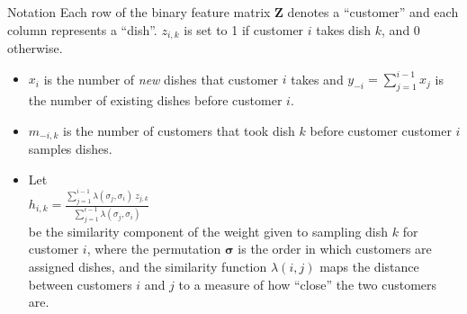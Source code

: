 \documentclass[serif,mathserif,final]{beamer}
\def\suml#1#2#3{\sum\limits_{#1=#2}^{#3}}
\def\ds{\displaystyle}
\def\hik{\ds\frac{\suml{j}{1}{i-1}\lambda(\sigma_j,\sigma_i)~z_{j,k}}
        {\suml{j}{1}{i-1}\lambda(\sigma_j,\sigma_i)}}
\begin{document}
\begin{frame}{}
\begin{columns}[t]
\begin{column}{0.25\linewidth}
      \begin{block}{Notation}
        Each row of the binary feature matrix $\bm Z$ denotes a ``customer''
        and each column represents a ``dish''. $z_{i,k}$ is set to 1 if
        customer $i$ takes dish $k$, and  0 otherwise. \\
        \vspace{1em}
        \begin{itemize}
          \setlength{\itemsep}{20pt}
          \item $x_i$ is the number of \textit{new} dishes that customer $i$ takes
            and $y_{-i} = \suml{j}{1}{i-1} x_j$ is the number of existing dishes
            before customer $i$.
          \item $m_{-i,k}$ is the number of customers that took dish $k$ before customer
            customer $i$ samples dishes.
          \item Let \\\hspace{.25\textwidth} $h_{i,k} = \hik$ \\
            be the similarity component of the weight
            given to sampling dish $k$ for customer $i$, where the permutation
            $\bm\sigma$ is the order in which customers are assigned dishes, 
            and the similarity function $\lambda(i,j)$ maps the distance between
            customers $i$ and $j$ to a measure of how ``close'' the two customers
            are. 

        \end{itemize}
      \end{block}



\end{column}
\end{columns}
\end{frame}
\end{document}
